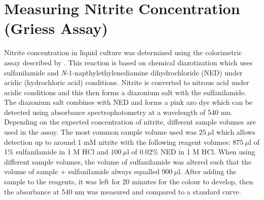\section{Measuring Nitrite Concentration (Griess Assay)}
Nitrite concentration in liquid culture was determined using the colorimetric assay described by \citet{DonaldNicholas1957}. This reaction is based on chemical diazotization which uses sulfanilamide and \textit{N}-1-napthylethylenediamine dihydrochloride (NED) under acidic (hydrochloric acid) conditions. Nitrite is converted to nitrous acid under acidic conditions and this then forms a diazonium salt with the sulfanilamide. The diazonium salt combines with NED and forms a pink azo dye which can be detected using absorbance spectrophotometry at a wavelength of 540 nm. Depending on the expected concentration of nitrite, different sample volumes are used in the assay. The most common sample volume used was $25~\mu\textrm{l}$ which allows detection up to around 1 mM nitrite with the following reagent volumes: $875~\mu\textrm{l}$ of 1\% sulfanilamide in 1 M HCl and $100~\mu\textrm{l}$ of 0.02\% NED in 1 M HCl. When using different sample 
volumes, the volume of sulfanilamide was altered such that the volume of sample + sulfanilamide always equalled $900~\mu\textrm{l}$. After adding the sample to the reagents, it was left for 20 minutes for the colour to develop, then the absorbance at 540 nm was measured and compared to a standard curve.

